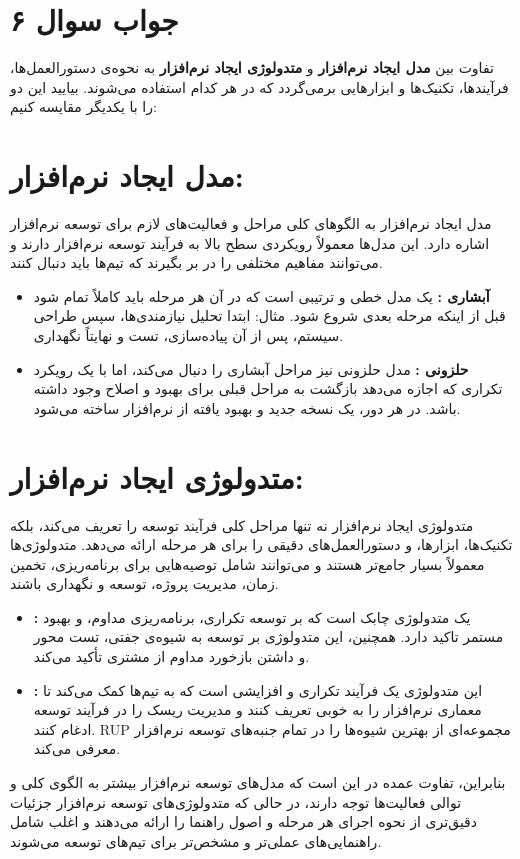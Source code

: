 \section*{جواب سوال ۶}

تفاوت بین
\textbf{مدل ایجاد نرم‌افزار}
و
\textbf{متدولوژی ایجاد نرم‌افزار}
به نحوه‌ی دستورالعمل‌ها، فرآیندها، تکنیک‌ها و ابزارهایی برمی‌گردد که در هر کدام استفاده می‌شوند. بیایید این دو را با یکدیگر مقایسه کنیم:

\section*{مدل ایجاد نرم‌افزار:}

مدل ایجاد نرم‌افزار به الگوهای کلی مراحل و فعالیت‌های لازم برای توسعه نرم‌افزار اشاره دارد. این مدل‌ها معمولاً رویکردی سطح بالا به فرآیند توسعه نرم‌افزار دارند و می‌توانند مفاهیم مختلفی را در بر بگیرند که تیم‌ها باید دنبال کنند.

\begin{itemize}
	\item \textbf{آبشاری  :}
یک مدل خطی و ترتیبی است که در آن هر مرحله باید کاملاً تمام شود قبل از اینکه مرحله بعدی شروع شود. مثال: ابتدا تحلیل نیازمندی‌ها، سپس طراحی سیستم، پس از آن پیاده‌سازی، تست و نهایتاً نگهداری.
	\item \textbf{حلزونی  :}
مدل حلزونی نیز مراحل آبشاری را دنبال می‌کند، اما با یک رویکرد تکراری که اجازه می‌دهد بازگشت به مراحل قبلی برای بهبود و اصلاح وجود داشته باشد. در هر دور، یک نسخه جدید و بهبود یافته از نرم‌افزار ساخته می‌شود.
\end{itemize}

\section*{متدولوژی ایجاد نرم‌افزار:}

متدولوژی ایجاد نرم‌افزار نه تنها مراحل کلی فرآیند توسعه را تعریف می‌کند، بلکه تکنیک‌ها، ابزارها، و دستورالعمل‌های دقیقی را برای هر مرحله ارائه می‌دهد. متدولوژی‌ها معمولاً بسیار جامع‌تر هستند و می‌توانند شامل توصیه‌هایی برای برنامه‌ریزی، تخمین زمان، مدیریت پروژه، توسعه و نگهداری باشند.

\begin{itemize}
	\item \textbf{ :}
یک متدولوژی چابک است که بر توسعه تکراری، برنامه‌ریزی مداوم، و بهبود مستمر تاکید دارد. همچنین، این متدولوژی بر توسعه به شیوه‌ی جفتی، تست محور و داشتن بازخورد مداوم از مشتری تأکید می‌کند.

	\item \textbf{ :}
این متدولوژی یک فرآیند تکراری و افزایشی است که به تیم‌ها کمک می‌کند تا معماری نرم‌افزار را به خوبی تعریف کنند و مدیریت ریسک را در فرآیند توسعه ادغام کنند. RUP مجموعه‌ای از بهترین شیوه‌ها را در تمام جنبه‌های توسعه نرم‌افزار معرفی می‌کند.
\end{itemize}

بنابراین، تفاوت عمده در این است که مدل‌های توسعه نرم‌افزار بیشتر به الگوی کلی و توالی فعالیت‌ها توجه دارند، در حالی که متدولوژی‌های توسعه نرم‌افزار جزئیات دقیق‌تری از نحوه اجرای هر مرحله و اصول راهنما را ارائه می‌دهند و اغلب شامل راهنمایی‌های عملی‌تر و مشخص‌تر برای تیم‌های توسعه می‌شوند.
